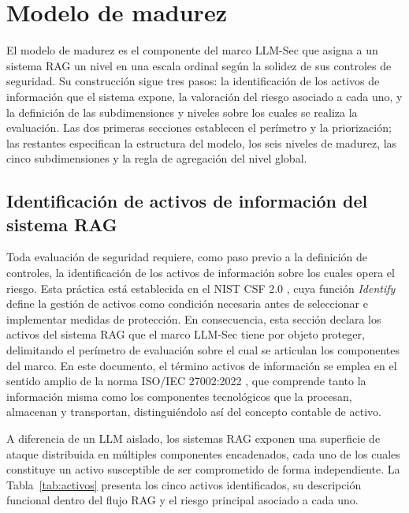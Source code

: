 \chapter{Modelo de madurez}
\label{ch:modelo-madurez}

El modelo de madurez es el componente del marco LLM-Sec que asigna a un sistema RAG un nivel en una escala ordinal según la solidez de sus controles de seguridad. Su construcción sigue tres pasos: la identificación de los activos de información que el sistema expone, la valoración del riesgo asociado a cada uno, y la definición de las subdimensiones y niveles sobre los cuales se realiza la evaluación. Las dos primeras secciones establecen el perímetro y la priorización; las restantes especifican la estructura del modelo, los seis niveles de madurez, las cinco subdimensiones y la regla de agregación del nivel global.


\section{Identificación de activos de información del sistema RAG}
\label{sec:activos}

Toda evaluación de seguridad requiere, como paso previo a la definición de controles, la identificación de los activos de información sobre los cuales opera el riesgo. Esta práctica está establecida en el NIST CSF 2.0 \cite{nistcsf}, cuya función \textit{Identify} define la gestión de activos como condición necesaria antes de seleccionar e implementar medidas de protección. En consecuencia, esta sección declara los activos del sistema RAG que el marco LLM-Sec tiene por objeto proteger, delimitando el perímetro de evaluación sobre el cual se articulan los componentes del marco. En este documento, el término activos de información se emplea en el sentido amplio de la norma ISO/IEC 27002:2022 \cite{iso27002}, que comprende tanto la información misma como los componentes tecnológicos que la procesan, almacenan y transportan, distinguiéndolo así del concepto contable de activo.

A diferencia de un LLM aislado, los sistemas RAG exponen una superficie de ataque distribuida en múltiples componentes encadenados, cada uno de los cuales constituye un activo susceptible de ser comprometido de forma independiente. La Tabla~\ref{tab:activos} presenta los cinco activos identificados, su descripción funcional dentro del flujo RAG y el riesgo principal asociado a cada uno.

